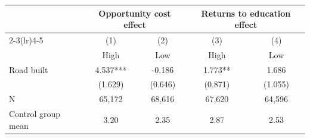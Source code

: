 {
\def\sym#1{\ifmmode^{#1}\else\(^{#1}\)\fi}
\begin{tabular}{l*{4}{c}}
\hline\hline
                         &\multicolumn{2}{c}{Opportunity cost effect}&\multicolumn{2}{c}{Returns to education effect}\\\cmidrule(lr){2-3}\cmidrule(lr){4-5}
                         &\multicolumn{1}{c}{(1)}&\multicolumn{1}{c}{(2)}&\multicolumn{1}{c}{(3)}&\multicolumn{1}{c}{(4)}\\
                         &\multicolumn{1}{c}{High}&\multicolumn{1}{c}{Low}&\multicolumn{1}{c}{High}&\multicolumn{1}{c}{Low}\\
\hline
Road built               &       4.537***&      -0.186   &       1.773** &       1.686   \\
                         &     (1.629)   &     (0.646)   &     (0.871)   &     (1.055)   \\
\hline
N                        &      65,172   &      68,616   &      67,620   &      64,596   \\
Control group mean       &        3.20   &        2.35   &        2.87   &        2.53   \\
\hline\hline
\end{tabular}
}
